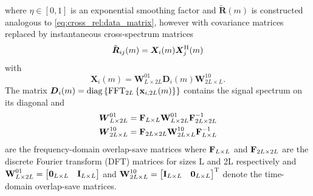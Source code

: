 \documentclass{article}
\newcommand{\x}{\mtxb{x}}
\newcommand{\Rf}{{\bm{{R}}}}
\begin{document}
where \(\eta \in [0,1]\) is an exponential smoothing factor and \(\tilde{\Rf}(m)\) is constructed analogous to \eqref{eq:cross_rel:data_matrix}, however with covariance matrices replaced by instantaneous cross-spectrum matrices 
\begin{equation}
    \tilde{\Rf}_{ij}(m) = \bm{X}_{i} (m) \bm{X}_{j}^\herm (m)
\end{equation}
with 
\begin{equation}
    \bm{X}_{i}(m) = \bm{{W}}^{01}_{L \times 2L} \bm{{D}}_{i}(m) \bm{{W}}^{10}_{2L \times L}.
\end{equation}
The matrix \(\bm{{D}}_{i}(m) = \operatorname{diag} \left\{ \operatorname{FFT}_{2L} \left\{ \x_{i,2L}(m) \right\} \right\}\) contains the  signal spectrum on its diagonal and
\begin{align}
    \bm{{W}}_{L \times 2L}^{01} &= \bm{\mathrm{F}}_{L \times L} \bm{\mathrm{W}}_{L \times 2L}^{01} \bm{\mathrm{F}}_{2L \times 2L}^{-1}\\
    \bm{{W}}_{2L \times L}^{10} &= \bm{\mathrm{F}}_{2L \times 2L} \bm{\mathrm{W}}_{2L \times L}^{10} \bm{\mathrm{F}}_{L \times L}^{-1}\label{eq:frequency_domain:overlap}
\end{align} are the frequency-domain overlap-save matrices where \(\bm{\mathrm{F}}_{L \times L}\) and \(\bm{\mathrm{F}}_{2L \times 2L}\) are the discrete Fourier transform (DFT) matrices for sizes L and 2L respectively and \(
    \bm{\mathrm{W}}_{L \times 2L}^{01} = \begin{bmatrix}
        \bm{\mathrm{0}}_{L \times L} & \bm{\mathrm{I}}_{L \times L}
    \end{bmatrix}\)
    and \(
    \bm{\mathrm{W}}_{2L \times L}^{10} = \begin{bmatrix}
        \bm{\mathrm{I}}_{L \times L} & \bm{\mathrm{0}}_{L \times L}
    \end{bmatrix}^{\mathrm{T}}\)
denote the time-domain overlap-save matrices.
\end{document}

